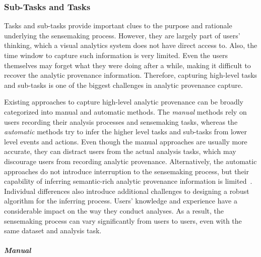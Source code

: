 \subsubsection{Sub-Tasks and Tasks}
Tasks and sub-tasks provide important clues to the purpose and rationale underlying the sensemaking process. However, they are largely part of users' thinking, which a visual analytics system does not have direct access to. Also, the time window to capture such information is very limited. Even the users themselves may forget what they were doing after a while, making it difficult to recover the analytic provenance information. Therefore, capturing high-level tasks and sub-tasks is one of the biggest challenges in analytic provenance capture.

Existing approaches to capture high-level analytic provenance can be broadly categorized into manual and automatic methods. The \emph{manual} methods rely on users recording their analysis processes and sensemaking tasks, whereas the \emph{automatic} methods try to infer the higher level tasks and sub-tasks from lower level events and actions. Even though the manual approaches are usually more accurate, they can distract users from the actual analysis tasks, which may discourage users from recording analytic provenance. Alternatively, the automatic approaches do not introduce interruption to the sensemaking process, but their capability of inferring semantic-rich analytic provenance information is limited~\cite{Gotz2009}. Individual differences also introduce additional challenges to designing a robust algorithm for the inferring process. Users' knowledge and experience have a considerable impact on the way they conduct analyses. As a result, the sensemaking process can vary significantly from users to users, even with the same dataset and analysis task. 

\subparagraph{Manual}

